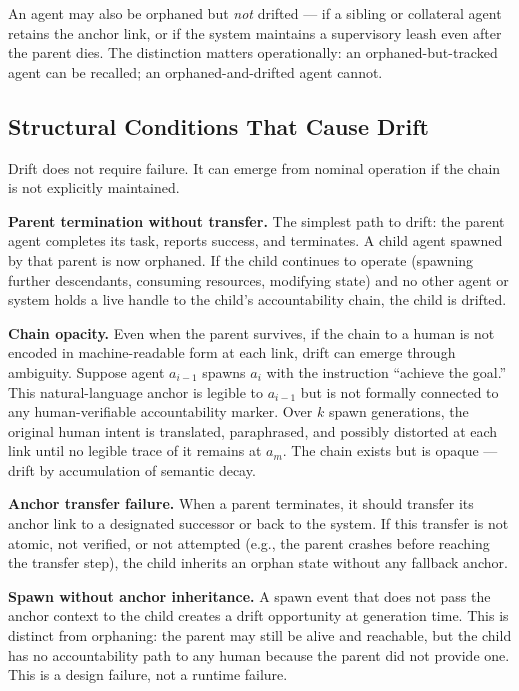 An agent may also be orphaned but \emph{not} drifted --- if a sibling or collateral agent retains the anchor link, or if the system maintains a supervisory leash even after the parent dies. The distinction matters operationally: an orphaned-but-tracked agent can be recalled; an orphaned-and-drifted agent cannot.

\subsection{Structural Conditions That Cause Drift}

Drift does not require failure. It can emerge from nominal operation if the chain is not explicitly maintained.

\textbf{Parent termination without transfer.} The simplest path to drift: the parent agent completes its task, reports success, and terminates. A child agent spawned by that parent is now orphaned. If the child continues to operate (spawning further descendants, consuming resources, modifying state) and no other agent or system holds a live handle to the child's accountability chain, the child is drifted.

\textbf{Chain opacity.} Even when the parent survives, if the chain to a human is not encoded in machine-readable form at each link, drift can emerge through ambiguity. Suppose agent $a_{i-1}$ spawns $a_i$ with the instruction ``achieve the goal.'' This natural-language anchor is legible to $a_{i-1}$ but is not formally connected to any human-verifiable accountability marker. Over $k$ spawn generations, the original human intent is translated, paraphrased, and possibly distorted at each link until no legible trace of it remains at $a_m$. The chain exists but is opaque --- drift by accumulation of semantic decay.

\textbf{Anchor transfer failure.} When a parent terminates, it should transfer its anchor link to a designated successor or back to the system. If this transfer is not atomic, not verified, or not attempted (e.g., the parent crashes before reaching the transfer step), the child inherits an orphan state without any fallback anchor.

\textbf{Spawn without anchor inheritance.} A spawn event that does not pass the anchor context to the child creates a drift opportunity at generation time. This is distinct from orphaning: the parent may still be alive and reachable, but the child has no accountability path to any human because the parent did not provide one. This is a design failure, not a runtime failure.

